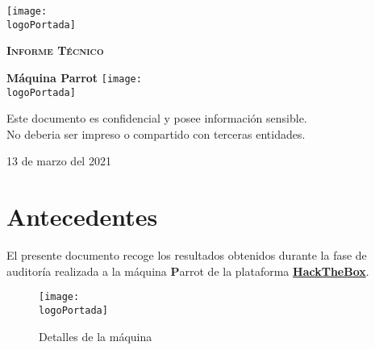 \documentclass[a4paper]{article}
\newcommand{\logoPortada}{REPORTS/parrot.jpg}
\newcommand{\machineName}{Parrot}
\newcommand{\startDate}{13 de marzo del 2021}
\begin{document}
    \cfoot{\thepage}
    \begin{titlepage}
    \centering
    \texttt{[image: \\logoPortada]}\par\vspace{1cm}
    
    {\scshape\large\textbf{Informe Técnico}} \vspace{2cm}
    
    {\Huge\bfseries\textcolor{redPortada}{Máquina \machineName}}
    \vfill
    \vspace{1cm}
    \texttt{[image: \\logoPortada]}\par\vspace{1cm}
    \vfill
    \begin{tcolorbox}[colback=red!5!white,colframe=red!75!black]
        \centering
        Este documento es confidencial y posee información sensible.\\No deberia ser impreso o compartido con terceras entidades.
    \end{tcolorbox}
    \vfill
    {\large \startDate\par}
    
    \vfill
    \end{titlepage}
    \vfill
    
    \clearpage
    
    \tableofcontents
    \clearpage
    
    \section{Antecedentes}
    El presente documento recoge los resultados obtenidos durante la fase de auditoría realizada a la máquina {\textbf\machineName} de la plataforma \href{https://hackthebox.eu}{\textbf{\color{blue}HackTheBox}}.
    
    \vspace{0.2cm}
    
    \begin{figure}[h]
        \centering
        \texttt{[image: \\logoPortada]}
        \caption{Detalles de la máquina}
    \end{figure}
    
    \vspace{0.2cm}
    
    \begin{tcolorbox}[enhanced,attach boxed title to top center={yshift=-3mm,yshifttext=-1mm},
      colback=blue!5!white,colframe=blue!75!black,colbacktitle=redPortada!80!black,
      title=Dirección URL,fonttitle=\bfseries,
      boxed title style={size=small,colframe=red!50!black} ]
      \centering
      \href{https://hackthebox.eu/home/machines/profile/98}{\color{brown}{https://hackthebox.eu/home/machines/profile/98}}
\end{tcolorbox}
    
\end{document}
